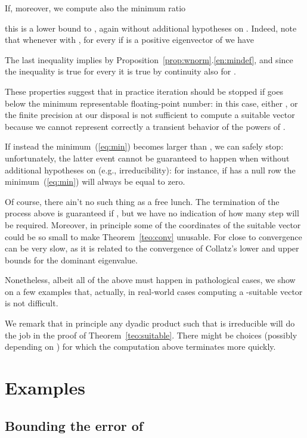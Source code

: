 \documentclass{article}
\newcommand{\1}{\mathbf 1}
\begin{document}
If, moreover, we compute also the minimum ratio

this is a lower bound to , again without additional hypotheses on .
Indeed, note that whenever  with
, for every  if  is a positive eigenvector of
 we have

The last inequality implies  by
Proposition~\ref{prop:wnorm}.\ref{en:mindef}, and since the inequality is
true for every  it is true by continuity also for .

These properties suggest that in practice iteration should be stopped if
 goes below the minimum representable floating-point number: in this case, either
, or the finite precision at our disposal is not sufficient to
compute a suitable vector because we cannot represent correctly a transient
behavior of the powers of .

If instead the minimum~(\ref{eq:min}) becomes larger than , we can
safely stop: unfortunately, the latter event cannot be guaranteed to happen when
 without additional hypotheses on  (e.g., irreducibility):
for instance, if  has a null row the minimum~(\ref{eq:min}) will always be equal to zero.



Of course, there ain't no such thing as a free lunch. The termination
of the process above is guaranteed if , but we have no indication of how many step will be
required. Moreover, in principle some of the coordinates of the suitable vector could be so small 
to make Theorem~\ref{teo:conv}
unusable. For  close to 
convergence can be very slow, as it is related to the convergence of Collatz's
lower and upper bounds for the dominant eigenvalue.

Nonetheless, albeit all of the above must happen in pathological cases, we show on
a few examples that, actually, in real-world cases computing a -suitable
vector is not difficult.

We remark that in principle any dyadic product  such that  is irreducible will do the job in the proof of
Theorem~\ref{teo:suitable}. There might be choices (possibly depending on
) for which the computation above terminates more quickly.

\section{Examples}

\subsection{Bounding the error of }
\end{document}
